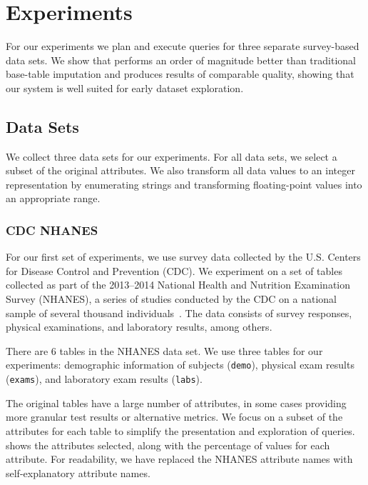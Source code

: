 \section{Experiments}\label{sec:experiments}
For our experiments we plan and execute queries for three separate survey-based data sets.
We show that \ProjectName{} performs an order of magnitude better than traditional
base-table imputation and produces results of comparable quality, showing that our system is well suited for early dataset exploration.

\subsection{Data Sets}\label{subsec:datasets}
We collect three data sets for our experiments.
For all data sets, we select a subset of the original attributes.
We also transform all data values to an integer representation by enumerating strings and transforming floating-point values into an appropriate range.

\subsubsection{CDC NHANES}
For our first set of experiments, we use survey data collected by the 
U.S. Centers for Disease Control and Prevention (CDC). We
experiment on a set of tables collected as part of the 2013--2014 National
Health and Nutrition Examination Survey (NHANES), a series of studies
conducted by the CDC on a national sample of several thousand individuals~\cite{cdc-data}.
The data consists of survey responses, physical examinations, and laboratory
results, among others.

There are 6 tables in the NHANES data set. We use three tables for our experiments: demographic information of subjects (\texttt{demo}), physical exam results (\texttt{exams}), and laboratory exam results (\texttt{labs}).

The original tables have a large number of attributes, in some cases providing more granular test results or alternative metrics.
We focus on a subset of the attributes for each table to simplify the presentation and exploration of queries.
 shows the attributes selected, along with the percentage of \nullv{} values for each attribute.
For readability, we have replaced the NHANES attribute names with self-explanatory attribute names.

